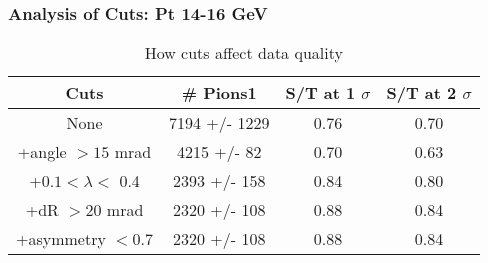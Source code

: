 \frame
{
\frametitle{Analysis of Cuts: Pt 14-16 GeV}
\begin{table}
\caption{How cuts affect data quality}
\centering
\begin{tabular}{c c c c}
\hline\hline
Cuts & \# Pions1 & S/T at 1 $\sigma$ & S/T at 2 $\sigma$ \\ [0.5ex]
\hline
None & 7194 +/- 1229 & 0.76 & 0.70 \\ %
+angle $> 15$ mrad & 4215 +/-   82 & 0.70 & 0.63 \\ %
+$0.1 < \lambda <$ 0.4 & 2393 +/-  158 & 0.84 & 0.80 \\ %
+dR $> 20$ mrad & 2320 +/-  108 & 0.88 & 0.84 \\ %
+asymmetry $< 0.7$ & 2320 +/-  108 & 0.88 & 0.84 \\ %
[1ex]
\hline
\end{tabular}
\label{table:nonlin}
\end{table}
}
